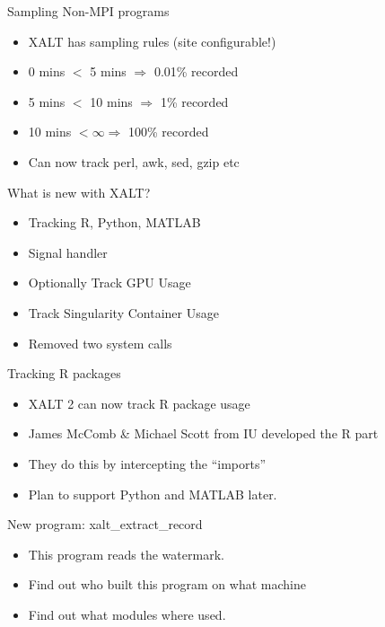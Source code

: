 \documentclass{beamer}
\begin{document}
\begin{frame}{Sampling Non-MPI programs}
  \begin{itemize}
    \item XALT has sampling rules (site configurable!)
    \item 0 mins $<$ 5 mins $\Rightarrow$ 0.01\% recorded  
    \item 5 mins $<$ 10 mins $\Rightarrow$ 1\% recorded  
    \item 10 mins $<  \infty \Rightarrow$ 100\% recorded
    \item Can now track perl, awk, sed, gzip etc
  \end{itemize}
\end{frame}

\begin{frame}{What is new with XALT?}
  \begin{itemize}
    \item Tracking R, Python, MATLAB
    \item Signal handler
    \item Optionally Track GPU Usage
    \item Track Singularity Container Usage
    \item Removed two system calls
  \end{itemize}
\end{frame}

\begin{frame}{Tracking R packages}
  \begin{itemize}
    \item XALT 2 can now track R package usage
    \item James McComb \& Michael Scott from IU developed the R part
    \item They do this by intercepting the ``imports''
    \item Plan to support Python and MATLAB later.
  \end{itemize}
\end{frame}

\begin{frame}{New program: xalt\_extract\_record}
  \begin{itemize}
    \item This program reads the watermark.
    \item Find out who built this program on what machine
    \item Find out what modules where used.
  \end{itemize}
\end{frame}
\end{document}
